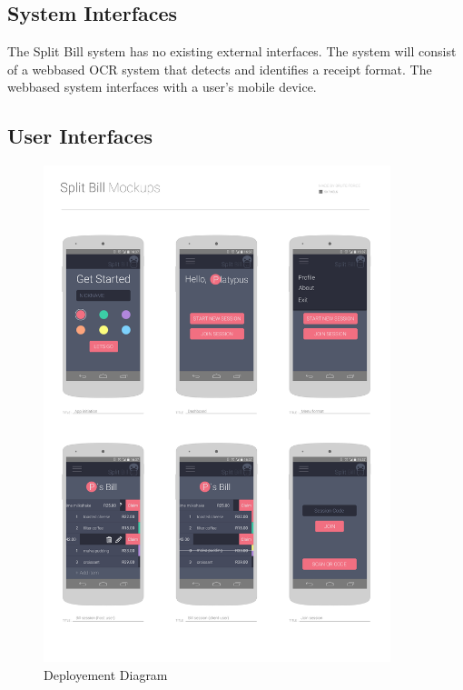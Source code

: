 \documentclass[12pt,a4paper]{article}
\begin{document}
   	\subsection{System Interfaces}
   		
		The Split Bill system has no existing external interfaces. The system will consist of a webbased OCR system that detects and identifies a receipt format. The webbased system interfaces with a user's mobile device.
   	\subsection{User Interfaces}
   		\begin{figure}[H]  
		  \includegraphics[width=0.9\textwidth]{diagrams/mockups.png}
		   \vspace{0.1cm}
		    \caption{Deployement Diagram}
		    \label{Deployment Diagram}
		\end{figure}
\end{document}
